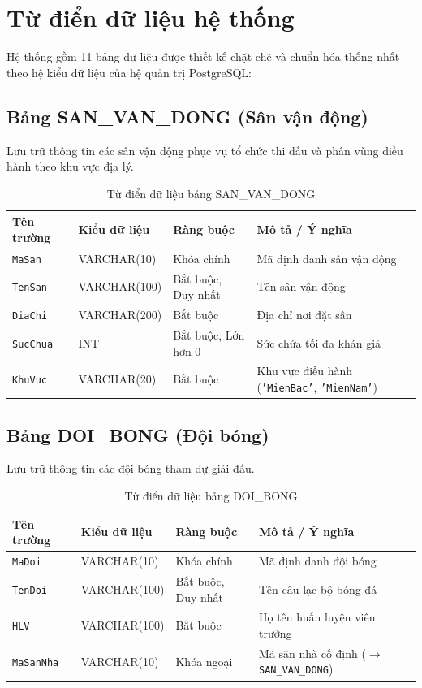 \section{Từ điển dữ liệu hệ thống}
Hệ thống gồm 11 bảng dữ liệu được thiết kế chặt chẽ và chuẩn hóa thống nhất theo hệ kiểu dữ liệu của hệ quản trị PostgreSQL:

\subsection{Bảng SAN\_VAN\_DONG (Sân vận động)}
Lưu trữ thông tin các sân vận động phục vụ tổ chức thi đấu và phân vùng điều hành theo khu vực địa lý.
\begin{table}[H]
\centering
\small
\begin{tabular}{|l|l|l|p{6cm}|}
\hline
\textbf{Tên trường} & \textbf{Kiểu dữ liệu} & \textbf{Ràng buộc} & \textbf{Mô tả / Ý nghĩa} \\ \hline
\texttt{MaSan} & VARCHAR(10) & Khóa chính & Mã định danh sân vận động \\ \hline
\texttt{TenSan} & VARCHAR(100) & Bắt buộc, Duy nhất & Tên sân vận động \\ \hline
\texttt{DiaChi} & VARCHAR(200) & Bắt buộc & Địa chỉ nơi đặt sân \\ \hline
\texttt{SucChua} & INT & Bắt buộc, Lớn hơn 0 & Sức chứa tối đa khán giả \\ \hline
\texttt{KhuVuc} & VARCHAR(20) & Bắt buộc & Khu vực điều hành (\texttt{'MienBac'}, \texttt{'MienNam'}) \\ \hline
\end{tabular}
\caption{Từ điển dữ liệu bảng SAN\_VAN\_DONG}
\end{table}

\subsection{Bảng DOI\_BONG (Đội bóng)}
Lưu trữ thông tin các đội bóng tham dự giải đấu.
\begin{table}[H]
\centering
\small
\begin{tabular}{|l|l|l|p{6cm}|}
\hline
\textbf{Tên trường} & \textbf{Kiểu dữ liệu} & \textbf{Ràng buộc} & \textbf{Mô tả / Ý nghĩa} \\ \hline
\texttt{MaDoi} & VARCHAR(10) & Khóa chính & Mã định danh đội bóng \\ \hline
\texttt{TenDoi} & VARCHAR(100) & Bắt buộc, Duy nhất & Tên câu lạc bộ bóng đá \\ \hline
\texttt{HLV} & VARCHAR(100) & Bắt buộc & Họ tên huấn luyện viên trưởng \\ \hline
\texttt{MaSanNha} & VARCHAR(10) & Khóa ngoại & Mã sân nhà cố định ($\rightarrow$ \texttt{SAN\_VAN\_DONG}) \\ \hline
\end{tabular}
\caption{Từ điển dữ liệu bảng DOI\_BONG}
\end{table}

